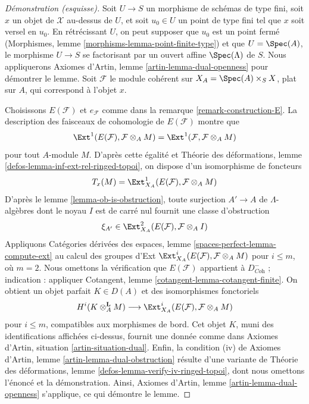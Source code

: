 \begin{proof}[Démonstration (esquisse)]
Soit $U \to S$ un morphisme de schémas de type fini, soit $x$ un objet de
$\mathcal{X}$ au-dessus de $U$, et soit $u_0 \in U$ un point de type fini tel
que $x$ soit versel en $u_0$. En rétrécissant $U$, on peut supposer que $u_0$
est un point fermé (Morphismes, lemme
\ref{morphisms-lemma-point-finite-type}) et que $U = \Spec(A)$, le morphisme
$U \to S$ se factorisant par un ouvert affine $\Spec(\Lambda)$ de $S$.
Nous appliquerons Axiomes d'Artin, lemme \ref{artin-lemma-dual-openness} pour
démontrer le lemme. Soit $\mathcal{F}$ le module cohérent sur
$X_A = \Spec(A) \times_S X$, plat sur $A$, qui correspond à l'objet $x$.

\medskip\noindent
Choisissons $E(\mathcal{F})$ et $e_\mathcal{F}$ comme dans
la remarque \ref{remark-construction-E}.
La description des faisceaux de cohomologie de $E(\mathcal{F})$ montre que
$$
\Ext^1(E(\mathcal{F}), \mathcal{F} \otimes_A M) =
\Ext^1(\mathcal{F}, \mathcal{F} \otimes_A M)
$$
pour tout $A$-module $M$. D'après cette égalité et
Théorie des déformations, lemme \ref{defos-lemma-inf-ext-rel-ringed-topoi},
on dispose d'un isomorphisme de foncteurs
$$
T_x(M) = \Ext^1_{X_A}(E(\mathcal{F}), \mathcal{F} \otimes_A M)
$$
D'après le lemme \ref{lemma-ob-is-obstruction}, toute surjection $A' \to A$
de $\Lambda$-algèbres dont le noyau $I$ est de carré nul fournit une classe
d'obstruction
$$
\xi_{A'} \in \Ext^2_{X_A}(E(\mathcal{F}), \mathcal{F} \otimes_A I)
$$
Appliquons Catégories dérivées des espaces, lemme
\ref{spaces-perfect-lemma-compute-ext} au calcul des groupes d'Ext
$\Ext^i_{X_A}(E(\mathcal{F}), \mathcal{F} \otimes_A M)$
pour $i \leq m$, où $m = 2$. Nous omettons la vérification que
$E(\mathcal{F})$ appartient à $D^-_{\textit{Coh}}$ ; indication : appliquer
Cotangent, lemme \ref{cotangent-lemma-cotangent-finite}.
On obtient un objet parfait $K \in D(A)$ et des isomorphismes fonctoriels
$$
H^i(K \otimes_A^\mathbf{L} M)
\longrightarrow
\Ext^i_{X_A}(E(\mathcal{F}), \mathcal{F} \otimes_A M)
$$
pour $i \leq m$, compatibles aux morphismes de bord. Cet objet $K$, muni des
identifications affichées ci-dessus, fournit une donnée comme dans
Axiomes d'Artin, situation \ref{artin-situation-dual}.
Enfin, la condition (iv) de
Axiomes d'Artin, lemme \ref{artin-lemma-dual-obstruction}
résulte d'une variante de
Théorie des déformations, lemme \ref{defos-lemma-verify-iv-ringed-topoi},
dont nous omettons l'énoncé et la démonstration.
Ainsi, Axiomes d'Artin, lemme \ref{artin-lemma-dual-openness}
s'applique, ce qui démontre le lemme.
\end{proof}

